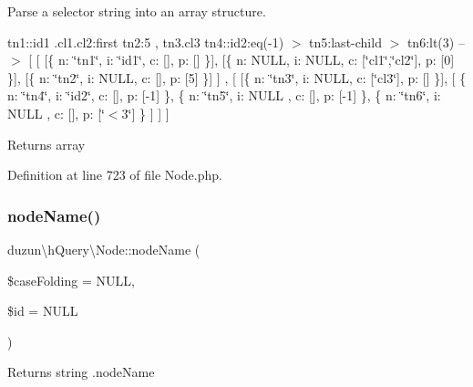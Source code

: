 Parse a selector string into an array structure.

tn1\+::id1 .cl1.\+cl2\+:first tn2\+:5 , tn3.\+cl3 tn4\+::id2\+:eq(-\/1) $>$ tn5\+:last-\/child $>$ tn6\+:lt(3) --$>$ \mbox{[} \mbox{[} \mbox{[}\{ n\+: \char`\"{}tn1\char`\"{}, i\+: \char`\"{}id1\char`\"{}, c\+: \mbox{[}\mbox{]}, p\+: \mbox{[}\mbox{]} \}\mbox{]}, \mbox{[}\{ n\+: N\+U\+LL, i\+: N\+U\+LL, c\+: \mbox{[}\char`\"{}cl1\char`\"{},\char`\"{}cl2\char`\"{}\mbox{]}, p\+: \mbox{[}0\mbox{]} \}\mbox{]}, \mbox{[}\{ n\+: \char`\"{}tn2\char`\"{}, i\+: N\+U\+LL, c\+: \mbox{[}\mbox{]}, p\+: \mbox{[}5\mbox{]} \}\mbox{]} \mbox{]} , \mbox{[} \mbox{[}\{ n\+: \char`\"{}tn3\char`\"{}, i\+: N\+U\+LL, c\+: \mbox{[}\char`\"{}cl3\char`\"{}\mbox{]}, p\+: \mbox{[}\mbox{]} \}\mbox{]}, \mbox{[} \{ n\+: \char`\"{}tn4\char`\"{}, i\+: \char`\"{}id2\char`\"{}, c\+: \mbox{[}\mbox{]}, p\+: \mbox{[}-\/1\mbox{]} \}, \{ n\+: \char`\"{}tn5\char`\"{}, i\+: N\+U\+LL , c\+: \mbox{[}\mbox{]}, p\+: \mbox{[}-\/1\mbox{]} \}, \{ n\+: \char`\"{}tn6\char`\"{}, i\+: N\+U\+LL , c\+: \mbox{[}\mbox{]}, p\+: \mbox{[}\char`\"{}$<$3\char`\"{}\mbox{]} \} \mbox{]} \mbox{]} \mbox{]}

\begin{DoxyReturn}{Returns}
array 
\end{DoxyReturn}


Definition at line 723 of file Node.\+php.

\mbox{\label{classduzun_1_1hQuery_1_1Node_a82cc8fc0d4acd22bb0cd3fd50389f32d}} 
\subsubsection{\texorpdfstring{node\+Name()}{nodeName()}}
{\footnotesize\ttfamily duzun\textbackslash{}h\+Query\textbackslash{}\+Node\+::node\+Name (\begin{DoxyParamCaption}\item[{}]{\$case\+Folding = {\ttfamily NULL},  }\item[{}]{\$id = {\ttfamily NULL} }\end{DoxyParamCaption})}

\begin{DoxyReturn}{Returns}
string .node\+Name 
\end{DoxyReturn}


